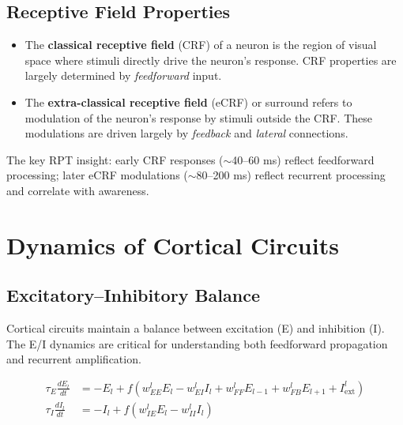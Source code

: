 \documentclass[11pt,a4paper]{report}
\begin{document}
\subsection{Receptive Field Properties}

\begin{definitionbox}
\begin{itemize}[leftmargin=1.5em]
  \item The \textbf{classical receptive field} (CRF) of a neuron is the region of visual space where stimuli directly drive the neuron's response. CRF properties are largely determined by \emph{feedforward} input.
  \item The \textbf{extra-classical receptive field} (eCRF) or surround refers to modulation of the neuron's response by stimuli outside the CRF. These modulations are driven largely by \emph{feedback} and \emph{lateral} connections.
\end{itemize}
The key RPT insight: early CRF responses ($\sim$40--60 ms) reflect feedforward processing; later eCRF modulations ($\sim$80--200 ms) reflect recurrent processing and correlate with awareness.
\end{definitionbox}

\section{Dynamics of Cortical Circuits}

\subsection{Excitatory--Inhibitory Balance}

Cortical circuits maintain a balance between excitation (E) and inhibition (I). The E/I dynamics are critical for understanding both feedforward propagation and recurrent amplification.

\begin{mathbox}
\vspace{-6pt}
\begin{align}
  \tau_E \frac{dE_l}{dt} &= -E_l + f\!\left(w_{EE}^{l} E_l - w_{EI}^{l} I_l + w_{FF}^{l} E_{l-1} + w_{FB}^{l} E_{l+1} + I_{\text{ext}}^l\right) \label{eq:exc} \\[6pt]
  \tau_I \frac{dI_l}{dt} &= -I_l + f\!\left(w_{IE}^{l} E_l - w_{II}^{l} I_l\right) \label{eq:inh}
\end{align}
\vspace{-8pt}
\end{mathbox}
\end{document}
